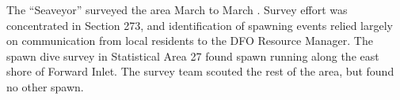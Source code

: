 The ``Seaveyor'' surveyed the area March  to March .
Survey effort was concentrated in Section 273, and
identification of spawning events relied largely on communication
from local residents to the DFO Resource Manager.
The spawn dive survey in Statistical Area 27 found spawn
running along the east shore of Forward Inlet.
The survey team scouted the rest of the area, but found no other spawn.
